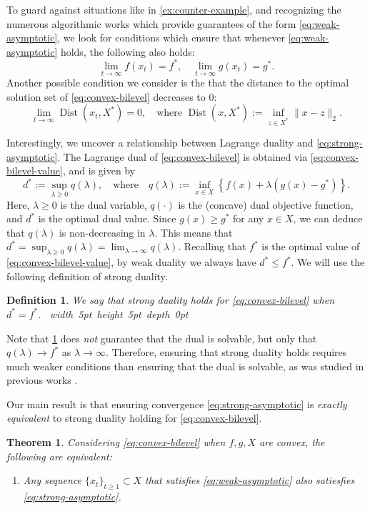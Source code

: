 \documentclass[11pt,oneside]{article}
\theoremstyle{plain}
\newtheorem{theorem}{Theorem}
\theoremstyle{plain}
\theoremstyle{plain}%
\newtheorem{definition}{Definition}%
\DeclareMathOperator{\Dist}{Dist}
\newcommand{\epr}{\hfill\hbox{\hskip 4pt \vrule width 5pt height 5pt depth 0pt}\vspace{0.0cm}\par}
\begin{document}
{To guard against situations like in \cref{ex:counter-example}, and recognizing the numerous algorithmic works which provide guarantees of the form \cref{eq:weak-asymptotic}, we look for conditions which ensure that whenever \cref{eq:weak-asymptotic} holds, the following also holds:
\begin{equation} \label{eq:strong-asymptotic}
	\lim_{t \to \infty}f(x_t) = f^*, \quad \lim_{t \to \infty} g(x_t) = g^*.
\end{equation}
Another possible condition we consider is the that the distance to the optimal solution set of \cref{eq:convex-bilevel} decreases to $0$:
\begin{equation} \label{eq:strong-solution}
	\lim_{t \to \infty} \Dist(x_t,X^*) = 0, \quad \text{where } \Dist(x,X^*) := \inf_{z \in X^*} \|x-z\|_2.
\end{equation}

Interestingly, we uncover a relationship between Lagrange duality and \cref{eq:strong-asymptotic}. The Lagrange dual of \cref{eq:convex-bilevel} is obtained via \cref{eq:convex-bilevel-value}, and is given by
\begin{equation}\label{eq:lagrange-dual}
d^* := \sup_{\lambda \geq 0} q(\lambda), \quad \text{where} \quad q(\lambda) := \inf_{x \in X} \left\{ f(x) + \lambda (g(x) - g^*) \right\}.
\end{equation}
Here, $\lambda \geq 0$ is the dual variable, $q(\cdot)$ is the (concave) dual objective function, and $d^*$ is the optimal dual value. Since $g(x) \geq g^*$ for any $x \in X$, we can deduce that $q(\lambda)$ is non-decreasing in $\lambda$. This means that $d^* = \sup_{\lambda \geq 0} q(\lambda) = \lim_{\lambda \to \infty} q(\lambda)$. Recalling that $f^*$ is the optimal value of \cref{eq:convex-bilevel-value}, by weak duality we always have $d^* \leq f^*$. We will use the following definition of strong duality.
\begin{definition}\label{def:strong-duality}
We say that \emph{strong duality} holds for \cref{eq:convex-bilevel} when $d^* = f^*$.
\epr
\end{definition}
Note that \cref{def:strong-duality} does \emph{not} guarantee that the dual is solvable, but only that $q(\lambda) \to f^*$ as $\lambda \to \infty$. Therefore, ensuring that strong duality holds requires much weaker conditions than ensuring that the dual is solvable, as was studied in previous works \citep{FriedlanderEtAl2008,DempeEtAl2010,FrankeEtAl2018}.

Our main result is that ensuring convergence \cref{eq:strong-asymptotic} is \emph{exactly equivalent} to strong duality holding for \cref{eq:convex-bilevel}.
\begin{theorem}\label{thm:duality-equivalence}
Considering \cref{eq:convex-bilevel} when $f,g,X$ are convex, the following are equivalent:
\begin{enumerate}
    \item Any sequence $\{x_t\}_{t \geq 1} \subset X$ that satisfies \cref{eq:weak-asymptotic} also satiesfies \cref{eq:strong-asymptotic}.


\end{enumerate}
\end{theorem}}
\end{document}
